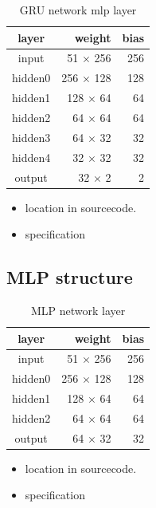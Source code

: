 \begin{table}[H]
\centering
\begin{tabular}{|c|r|r|}
\hline 
layer  & weight   & bias \\ \hline \hline
input  & 51 $\times$ 256 & 256  \\
hidden0 & 256 $\times$ 128 & 128 \\
hidden1 & 128 $\times$ 64  & 64  \\
hidden2 & 64 $\times$ 64   & 64  \\
hidden3 & 64 $\times$ 32   & 32  \\
hidden4 & 32 $\times$ 32   & 32  \\
output & 32 $\times$ 2    & 2  \\
\hline
\end{tabular} 
\caption{GRU network mlp layer}
\label{tab:reward_gru_mlp_network}
\end{table}


\begin{itemize}
\item location in sourcecode.
\item specification
\end{itemize}

\subsection{MLP structure}



\begin{table}[H]
\centering
\begin{tabular}{|c|r|r|}
\hline 
layer  & weight   & bias \\ \hline \hline
input  & 51 $\times$ 256 & 256  \\
hidden0 & 256 $\times$ 128 & 128 \\
hidden1 & 128 $\times$ 64  & 64  \\
hidden2 & 64 $\times$ 64   & 64  \\
output & 64 $\times$ 32   & 32  \\
\hline
\end{tabular} 
\caption{MLP network layer}
\label{tab:reward_mlp_network}
\end{table}



\begin{itemize}
\item location in sourcecode.
\item specification
\end{itemize}

